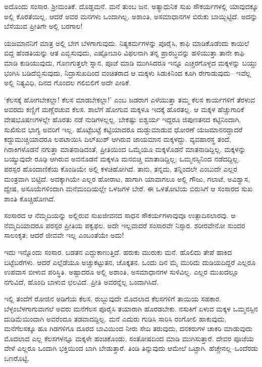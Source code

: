 
ಅದೊಂದು ಸಂಸಾರ. ಶ‍್ರೀಮಂತಿಕೆ. ದೊಡ್ಡಮನೆ. ಮನೆ ತುಂಬ ಜನ. ಅತ್ಯಾಧುನಿಕ ಸುಖ ಸೌಕರ್ಯಗಳಲ್ಲಿ ಯಾವುದಕ್ಕೂ ಅಲ್ಲಿ ಕೊರತೆಯಿಲ್ಲ. ಆದರೆ ಅವರ ಮನಗಳು ಒಂದಾಗಿಲ್ಲ. ಅಶಾಂತಿ, ಅಸಮಾಧಾನಗಳ ಬಿರುಕು ಬಾಯ್ಬಿಟ್ಟಿದೆ. ಅದನ್ನು ಬೆಸೆಯುವ ಪ್ರೀತಿಗೇ ಅಲ್ಲಿ ಬರಗಾಲ!

ಯಜಮಾನನಿಗೆ ಮಾತ್ರ ಅಲ್ಲಿ ಬೇಗ ಬೆಳಗಾಗುವುದು. ನಿತ್ಯಕರ್ಮಗಳನ್ನು ಪೂರೈಸಿ, ಕಾಫಿ ಮಾಡಿಕೊಡೆಂದು ಕಾಯಿಲೆ ಬಿದ್ದ ಹೆಂಡತಿಯನ್ನು ಆತ ಎಬ್ಬಿಸುವುದು, ಎಷ್ಟೋಬಾರಿ ವಿಫಲನಾಗಿ ತನ್ನ ಪ್ರಾರಬ್ಧವನ್ನು ಹಳಿಯುತ್ತಾ ತಾನೇ ಕಾಫಿ ಮಾಡಿ ಕುಡಿಯುವುದು, ಗೊಣಗುತ್ತಲೇ ಸ್ನಾನ, ಪೂಜೆ ಮಾಡಿ ಮುಗಿಸಿದರೂ ಇನ್ನೂ ಎಚ್ಚರಗೊಳ್ಳದ ಮಕ್ಕಳನ್ನು ಬಯ್ದು ಭಂಗಿಸಿ ಬಡಿದೆಬ್ಬಿಸುವುದು, ನಿದ್ರಾಸುಖದಿಂದ ವಂಚಿತರಾದ ಆ ಮಕ್ಕಳು ಸಿಡುಕಿನಿಂದ ಕೂಗಿ ರೇಗಾಡುವುದು– ಇವೆಲ್ಲ ಅಲ್ಲಿ ನಿತ್ಯವಿಧಿ, ದಿನದ ಗೊಂದಲ ಗಲಿಬಿಲಿಗೆ ಅದೇ ಪೀಠಿಕೆ.

‘ಕೆಲಸಕ್ಕೆ ಹೋಗಬೇಕಲ್ಲಾ! ಕೆಲಸ ಮಾಡಬೇಕಲ್ಲಾ!’ ಎಂಬ ಜಡರಾಗ ಎಳೆಯುತ್ತಾ ತಮ್ಮ ಕೆಲಸ ಕಾರ್ಯಗಳಿಗೆ ತೆರಳುವ ಅವರದು ಕಣ್ಣಿಗೆ ಮಣ್ಣೆರಚುವ ಕೆಲಸ. ಶಾಲೆಗೆ ಹೋಗುವ ಮಕ್ಕಳೂ ಇದಕ್ಕೆ ಹೊರತಲ್ಲ. ಆ ಮಕ್ಕಳ ಹೆಚ್ಚುಗಾರಿಕೆ ವೇಷಭೂಷಣಗಳಲ್ಲೇ ಹೊರತು ನಡೆ ನುಡಿಗಳಲ್ಲಲ್ಲ. ಬೇಕಷ್ಟು ಐಶ್ವರ್ಯ ಇದ್ದರೂ ಜಿಪುಣತನದ ಕಟ್ಟಿನಿಂದಾಗಿ, ಸುಖಿಸುವ ಭಾಗ್ಯ ಅವರಿಗೆ ಇಲ್ಲ. ಹೊಟ್ಟೆಬಟ್ಟೆ ಕಟ್ಟಿಯಾದರೂ ದುಡ್ಡುಮಾಡುವ ಧೋರಣೆ ಯಜಮಾನನದ್ದಾದರೆ ಕದ್ದುಮುಚ್ಚಿಯಾದರೂ ಲಪಟಾಯಿಸಿ ದಿಲ್​ಖುಶ್ ಆಗಿರುವ ಜಾಯಮಾನ ಮಕ್ಕಳದ್ದು. ವ್ಯವಹಾರಸ್ಥ ತಂದೆ, ಗಿರಾಕಿಗಳೊಡನೆ ನಗುತ್ತಾ ಮಾತನಾಡಿದಂತೆ, ಪ್ರೀತಿಯಿಂದ ಒಮ್ಮೆಯೂ ಮಕ್ಕಳೊಡನೆ ಮಾತನಾಡಿದ್ದಿಲ್ಲ. ಮಕ್ಕಳನ್ನು ಬಯ್ಯುವುದೇ ರೂಢಿ ಆಗಿರುವ ಅವನೊಡನೆ ಮಕ್ಕಳೂ ಮನಬಿಚ್ಚಿ ಮಾತಾಡಿದ್ದಿಲ್ಲ; ಒಮ್ಮನಸ್ಸಿನಿಂದ ನಡೆದದ್ದಿಲ್ಲ. ಪರಸ್ಪರ ಹೊಂದಾಣಿಕೆಯ ಕೊಂಡಿಯೇ ಅಲ್ಲಿ ಕಳಚಿಹೋಗಿದೆ. ತಾನು, ತನ್ನದು, ತನ್ನಿಂದಲೇ ಎಂಬುದೇ ಎಲ್ಲರ ಮಂತ್ರವಾಗಿ ಬಿಟ್ಟಿದೆ. ಅದಕ್ಕಾಗಿಯೇ ಎಲ್ಲರ ಹೋರಾಟ, ಹಾಗಾಗಿ ಯಾವಾಗಲೂ ಅಲ್ಲಿ ಗೌಜು, ಗಲಾಟೆ, ಅವಿಶ್ವಾಸ, ದ್ವೇಷ, ಅಸೂಯೆಗಳಿಂದಾಗಿ ಮನೆಮಂದಿಯಲ್ಲೇ ಒಳಜಗಳ ಬೇರೆ. ಈ ಒಳತೋಟಿಯ ಬಿರುಸಿಗೆ ಆ ಸಂಸಾರದ ಸುಖ ಶಾಂತಿ ಕೊಚ್ಚಿಹೋಗಿದೆ.

ಸಂಸಾರದ ಆ ನೆಮ್ಮದಿಯನ್ನು ಅಲ್ಲಿರುವ ಸುಖಜೀವನದ ಸಾಧನ ಸೌಕರ್ಯಗಳಾವುವೂ ಉತ್ಪಾದಿಸಲಾರವು. ಆ ನೆಮ್ಮದಿಯಾದರೂ ಪರಸ್ಪರ ಪ್ರೀತಿಯ ಪಕ್ವಫಲ. ಅದೇ ಇಲ್ಲವಾದರೆ ಸಂಸಾರವೇ ನಿಸ್ಸಾರ. ಶರೀರವೇನೋ ಸುಂದರ ಸಾಲಂಕೃತ; ಆದರೆ ಜೀವವೇ ಇಲ್ಲ ಎಂಬಂತೆಯೇ ಅದು!

ಇದು ಇನ್ನೊಂದು ಸಂಸಾರ. ಬಡತನ ಎದ್ದುಕಾಣುತ್ತಿದೆ. ಹರುಕು ಮುರುಕು ಮನೆ. ಹೊಲಿದು ತೇಪೆ ಹಾಕಿದ ಬಟ್ಟೆಬರೆಗಳು. ಆದರೆ ಎಲ್ಲೆಡೆಯೂ ಅಚ್ಚುಕಟ್ಟುತನ, ಚೊಕ್ಕತನ. ಒಂದು ದಿನ ಮೈ ಮುರಿದು ದುಡಿಯದಿದ್ದರೆ ಎಲ್ಲರೂ ಉಪವಾಸ ಬೀಳುವ ಪರಿಸ್ಥಿತಿ. ಅಷ್ಟಾದರೂ ಅಲ್ಲಿ ಅಶಾಂತಿ, ಅಸಮಾಧಾನಗಳ ಸುಳಿವಿಲ್ಲ. ಎಲ್ಲರ ಮುಖದಲ್ಲೂ ನಗುವಿದೆ, ಹೊಂದಿ ಬಾಳುವ ಛಲವಿದೆ. ಪ್ರೀತಿ ಅವರನ್ನೆಲ್ಲ ಒಂದಾಗಿಸಿದೆ.

ಇಲ್ಲಿ ತಂದೆಗೆ ರೋಜಿನ ಅಡಿಗೆಯ ಕೆಲಸ. ರುಬ್ಬುವುದೇ ಮೊದಲಾದ ಕೆಲಸಗಳಿಗೆ ತಾಯಿಯ ಸಹಕಾರ. ಬೆಳ್ಳಂಬೆಳಗಾಗುವಾಗಲೆ ಅವರು ಮನೆಗೆಲಸ ಪೂರೈಸಿ ತಯಾರಾಗಿ ಹೊರಡಬೇಕು. ನಸುಕಿಗೆ ಏಳುವ ಮಕ್ಕಳ ಒಮ್ಮನಸ್ಸಿನ ದುಡಿಮೆಯಿಂದಾಗಿ ಅವರೆಂದೂ ತಡವಾದದ್ದಿಲ್ಲ. ಮನೆ ಎದುರು ಗುಡಿಸಿ ಸಾರಿಸಿ ರಂಗೋಲಿ ಹಾಕುವುದು, ಮನೆಗೆಲಸಕ್ಕೂ ಹೂ ಗಿಡಗಳಿಗೂ ದೂರದ ಬಾವಿಯಿಂದ ನೀರು ಸೇದಿ ತರುವುದು, ದನಕರುಗಳ ಚಾಕರಿ ಮಾಡುವುದು ಮೊದಲಾದ ಎಲ್ಲ ಕೆಲಸಗಳನ್ನೂ ಮಕ್ಕಳೇ ಹಂಚಿಕೊಂಡು, ಸಂತೋಷದಿಂದ ಮಾಡಿ ಮುಗಿಸುತ್ತಾರೆ. ದೇವರ ಪೂಜೆಯ ವೇಳೆ ಎಲ್ಲರೂ ಒಂದಾಗಿ ಭಕ್ತಿಯಿಂದ ಬಾಗಿ ಬೇಡುತ್ತಾರೆ. ತಿಂಡಿ ತಿನ್ನುವುದು ಆಮೇಲೆ ಒಟ್ಟಾಗಿ. ಹೆಚ್ಚೇನಲ್ಲ–ಒಂದೆರಡು ಒಣರೊಟ್ಟಿ.

